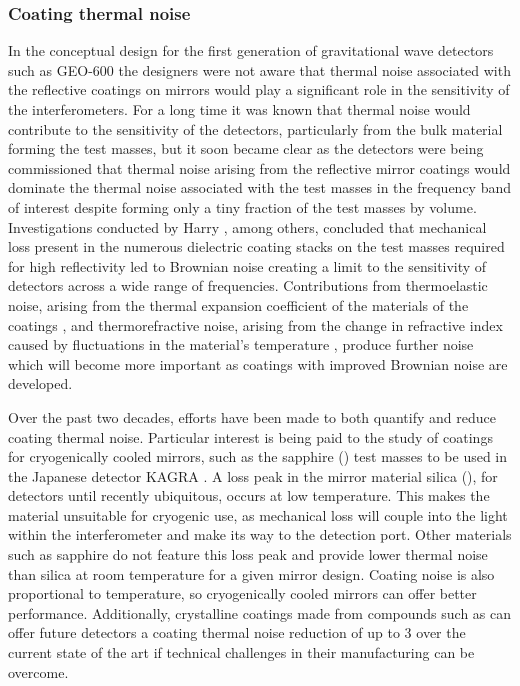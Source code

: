 \subsubsection{\label{sec:coating-thermal-noise}Coating thermal noise}
In the conceptual design for the first generation of gravitational wave detectors such as GEO-600 \cite{Willke2002} the designers were not aware that thermal noise associated with the reflective coatings on mirrors would play a significant role in the sensitivity of the interferometers. For a long time it was known that thermal noise would contribute to the sensitivity of the detectors, particularly from the bulk material forming the test masses, but it soon became clear as the detectors were being commissioned that thermal noise arising from the reflective mirror coatings would dominate the thermal noise associated with the test masses in the frequency band of interest despite forming only a tiny fraction of the test masses by volume. Investigations conducted by Harry \etal{} \cite{Harry2002, Harry2007}, among others, concluded that mechanical loss present in the numerous dielectric coating stacks on the test masses required for high reflectivity led to Brownian noise creating a limit to the sensitivity of detectors across a wide range of frequencies. Contributions from thermoelastic noise, arising from the thermal expansion coefficient of the materials of the coatings \cite{Braginsky1999a}, and thermorefractive noise, arising from the change in refractive index caused by fluctuations in the material's temperature \cite{Braginsky2000a}, produce further noise which will become more important as coatings with improved Brownian noise are developed.

Over the past two decades, efforts have been made to both quantify and reduce coating thermal noise. Particular interest is being paid to the study of coatings for cryogenically cooled mirrors, such as the sapphire () test masses to be used in the Japanese detector \gls{KAGRA} \cite{Somiya2012}. A loss peak in the mirror material silica (), for detectors until recently ubiquitous, occurs at low temperature. This makes the material unsuitable for cryogenic use, as mechanical loss will couple into the light within the interferometer and make its way to the detection port. Other materials such as sapphire do not feature this loss peak and provide lower thermal noise than silica at room temperature for a given mirror design. Coating noise is also proportional to temperature, so cryogenically cooled mirrors can offer better performance. Additionally, crystalline coatings made from compounds such as  can offer future detectors a coating thermal noise reduction of up to \num{3} over the current state of the art \cite{Cole2013} if technical challenges in their manufacturing can be overcome.

